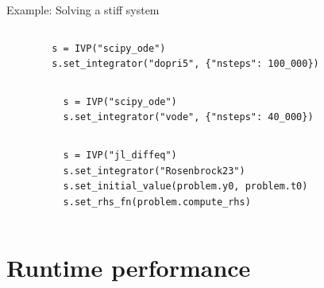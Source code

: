 \documentclass[
  10pt,
  aspectratio=169,
  english,
  onlytextwidth,  %
]{beamer}
\begin{document}
\begin{frame}[fragile]{Example: Solving a stiff system}
  \begin{columns}
    \begin{verbatim}
        s = IVP("scipy_ode")
        s.set_integrator("dopri5", {"nsteps": 100_000})
      \end{verbatim}
  \end{columns}

  \vspace{3em}
  \begin{columns}
    \begin{verbatim}
          s = IVP("scipy_ode")
          s.set_integrator("vode", {"nsteps": 40_000})
        \end{verbatim}

  \end{columns}

  \vspace{3em}
  \begin{columns}
    \begin{verbatim}
          s = IVP("jl_diffeq")
          s.set_integrator("Rosenbrock23")
          s.set_initial_value(problem.y0, problem.t0)
          s.set_rhs_fn(problem.compute_rhs)
        \end{verbatim}
  \end{columns}
\end{frame}

\section{Runtime performance}
\end{document}
